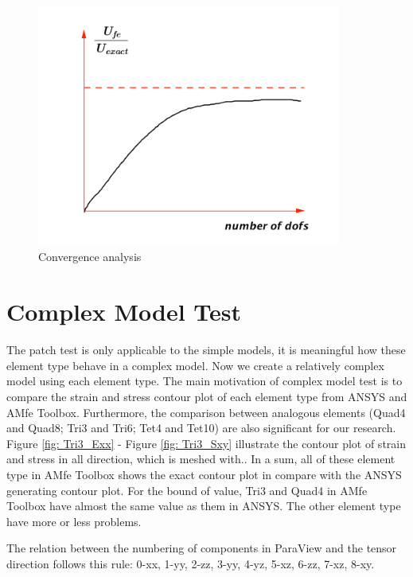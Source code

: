 \begin{figure}[htbp]
	\begin{center}	
		\includegraphics[width=10cm,clip]{convergence.pdf} 			
		\caption{Convergence analysis} \label{fig: convergence}
	\end{center}
\end{figure}


\section{Complex Model Test}
The patch test is only applicable to the simple models, it is meaningful how these element type behave in a complex model. Now we create a relatively complex model using each element type. The main motivation of complex model test is to compare the strain and stress contour plot of each element type from ANSYS and AMfe Toolbox. Furthermore, the comparison between analogous elements (Quad4 and Quad8; Tri3 and Tri6; Tet4 and Tet10) are also significant for our research. Figure \ref{fig: Tri3_Exx} - Figure \ref{fig: Tri3_Sxy} illustrate the contour plot of strain and stress in all direction, which is meshed with..  
In a sum, all of these element type in AMfe Toolbox shows the exact contour plot in compare with the ANSYS generating contour plot. For the bound of value, Tri3 and Quad4 in AMfe Toolbox have almost the same value as them in ANSYS. The other element type have more or less problems.

The relation between the numbering of components in ParaView and the tensor direction follows this rule: 0-xx,  1-yy, 2-zz, 3-yy, 4-yz, 5-xz, 6-zz, 7-xz, 8-xy. 

